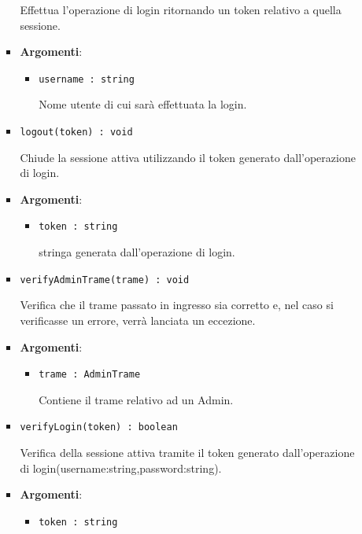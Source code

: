 \documentclass[../DefinizioneDiProdotto.tex]{subfiles}
\begin{document}
\begin{itemize}
\begin{itemize}
\begin{itemize}
	 Effettua l'operazione di login ritornando un token relativo a quella sessione.

	\item \textbf{Argomenti}:
	\begin{itemize}
	\item \texttt{username : string}\

	 Nome utente di cui sarà effettuata la login.
	\end{itemize}
	\end{itemize}\vspace{0.5em}
	\begin{itemize}
	\item \texttt{logout(token) : void}\

	 Chiude la sessione attiva utilizzando il token generato dall'operazione di login.

	\item \textbf{Argomenti}:
	\begin{itemize}
	\item \texttt{token : string}\

	 stringa generata dall'operazione di login.
	\end{itemize}
	\end{itemize}\vspace{0.5em}
	\begin{itemize}
	\item \texttt{verifyAdminTrame(trame) : void}\

	 Verifica che il trame passato in ingresso sia corretto e, nel caso si verificasse un errore, verrà lanciata un eccezione.

	\item \textbf{Argomenti}:
	\begin{itemize}
	\item \texttt{trame : AdminTrame}\

	 Contiene il trame relativo ad un Admin.
	\end{itemize}
	\end{itemize}\vspace{0.5em}
	\begin{itemize}
	\item \texttt{verifyLogin(token) : boolean}\

	 Verifica della sessione attiva tramite il token generato dall'operazione di login(username:string,password:string).

	\item \textbf{Argomenti}:
	\begin{itemize}
	\item \texttt{token : string}\


\end{itemize}
\end{itemize}
\end{itemize}
\end{itemize}
\end{document}
